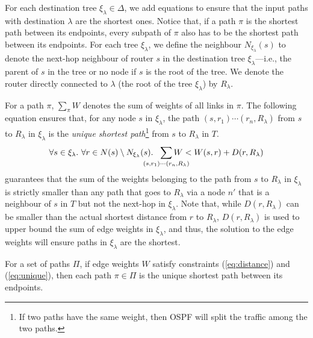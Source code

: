 For each destination tree $\xi_\lambda\in\Delta$, we add equations to ensure 
that the input paths with destination $\lambda$ are the shortest ones.
Notice that, if a path $\pi$
is the shortest path between its endpoints, every 
subpath of $\pi$ also has to be the shortest path between its endpoints.
For each tree $\xi_\lambda$, we define the neighbour
 $N_{\xi_\lambda}(s)$ to denote the 
next-hop neighbour of router $s$ in the destination tree $\xi_\lambda$---i.e., the parent
of $s$ in the tree or no node if $s$ is the root of the tree. We denote the
router directly connected to $\lambda$ (the root of the tree $\xi_\lambda$) by $R_\lambda$.

For a path $\pi$, 
$\sum_{\pi} W$ denotes the sum of weights of all 
links in $\pi$. 
The following equation ensures that, for any node $s$ in 
$\xi_\lambda$, 
the path $(s,r_1)\cdots (r_n,R_\lambda)$ from $s$ to $R_\lambda$ 
in $\xi_\lambda$ is the 
\emph{unique shortest path}\footnote{
If two paths have the same weight, then OSPF will 
split the traffic among the two paths.
} from $s$ to $R_\lambda$ in $T$. 
\begin{equation} \label{eq:unique}
\forall s \in \xi_\lambda. ~
\forall r \in N(s) \setminus N_{\xi_\lambda}(s).~~
\sum_{\mathclap{\substack{(s,r_1)\cdots (r_n,R_\lambda)}}} 
W < W(s,r) + D(r, R_\lambda)
\end{equation}
 guarantees that 
the sum of the weights belonging to the path 
from $s$ to $R_\lambda$ in $\xi_\lambda$ 
is strictly smaller than 
any path that goes to $R_\lambda$ via 
a node $n'$ that is a neighbour of $s$ in $T$ but not 
the next-hop in $\xi_\lambda$. Note that,
while $D(r, R_\lambda)$ can be smaller 
than the actual shortest
distance from $r$ to $R_\lambda$, 
$D(r, R_\lambda)$ is used to upper bound the sum of edge weights 
in $\xi_\lambda$, and  
thus, the solution to the edge weights will ensure 
paths in $\xi_\lambda$ are the shortest. 

\begin{theorem}
For a set of paths $\Pi$, if edge weights 
$W$ satisfy constraints (\ref{eq:distance}) and (\ref{eq:unique}), then 
each path $\pi \in \Pi$ is the unique shortest path between its endpoints. 
\end{theorem}
\iffull

\fi

